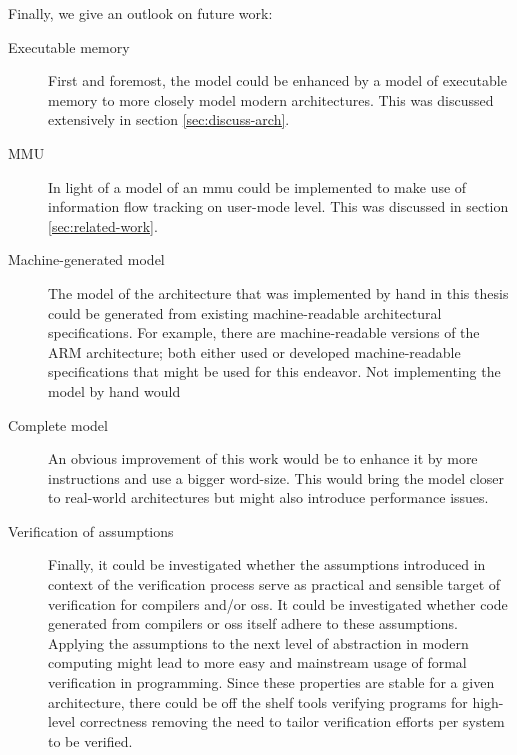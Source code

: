 Finally, we give an outlook on future work:
\begin{description}
    \item[Executable memory] First and foremost, the model could be enhanced by a model of executable memory to more closely model modern architectures.
    This was discussed extensively in section \ref{sec:discuss-arch}.
    \item[MMU] In light of \cite{KhakpourSD13} a model of an \gls{mmu} could be implemented to make use of information flow tracking on user-mode level.
    This was discussed in section \ref{sec:related-work}.
    \item[Machine-generated model] The model of the architecture that was implemented by hand in this thesis could be generated from existing machine-readable architectural specifications.
    For example, there are machine-readable versions of the ARM architecture; both \cite{Reid17,Fox02} either used or developed machine-readable specifications that might be used for this endeavor.
    Not implementing the model by hand would 
    \item[Complete model] An obvious improvement of this work would be to enhance it by more instructions and use a bigger word-size.
    This would bring the model closer to real-world architectures but might also introduce performance issues.
    \item[Verification of assumptions] Finally, it could be investigated whether the assumptions introduced in context of the verification process serve as practical and sensible target of verification for compilers and/or \glspl{os}.
    It could be investigated whether code generated from compilers or \glspl{os} itself adhere to these assumptions.
    Applying the assumptions to the next level of abstraction in modern computing might lead to more easy and mainstream usage of formal verification in programming.
    Since these properties are stable for a given architecture, there could be off the shelf tools verifying programs for high-level correctness removing the need to tailor verification efforts per system to be verified.
\end{description}
